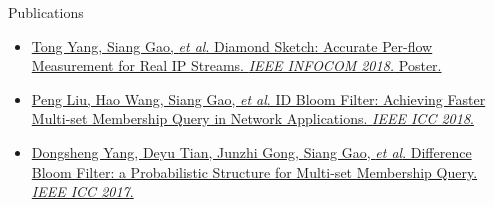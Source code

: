 \begin{MySection}{Publications}

\vspace{-0.1in}

\begin{itemize}
    \item \href{https://ieeexplore.ieee.org/document/8406946/}
    {Tong Yang, \underline{Siang Gao}, \textit{et al}. 
    Diamond Sketch: Accurate Per-flow Measurement 
    for Real IP Streams. 
    \textit{IEEE INFOCOM 2018.} Poster.}
    \item \href{https://ieeexplore.ieee.org/document/8422627/}
    {Peng Liu, Hao Wang, \underline{Siang Gao}, \textit{et al}. 
    ID Bloom Filter: Achieving Faster Multi-set 
    Membership Query in Network Applications. 
    \textit{IEEE ICC 2018}.}
    \item \href{https://ieeexplore.ieee.org/document/7996678/}
    {Dongsheng Yang, Deyu Tian, Junzhi Gong, 
    \underline{Siang Gao}, \textit{et al}. 
    Difference Bloom Filter: a Probabilistic 
    Structure for Multi-set Membership Query. 
    \textit{IEEE ICC 2017}.}
\end{itemize}

\vspace{-17pt}

\end{MySection}